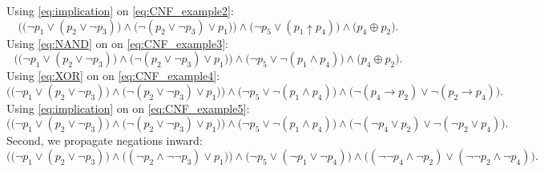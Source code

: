 Using \autoref{eq:implication} on \autoref{eq:CNF_example2}:
\begin{equation}\label{eq:CNF_example3}
    \bigg(
        \Big(
            \neg p_1 \vee (
                p_2 \vee \neg p_3
            )
        \Big) \wedge \Big(
                \neg (
                    p_2 \vee \neg p_3 
                ) \vee p_1 
            \Big)
    \bigg) \wedge \Big(
        \neg p_5 \vee (
            p_1 \uparrow p_4
        )
    \Big) \wedge \Big(
        p_4 \oplus p_2
    \Big).
\end{equation}
Using \autoref{eq:NAND} on on \autoref{eq:CNF_example3}:
\begin{equation}\label{eq:CNF_example4}
    \bigg(
        \Big(
            \neg p_1 \vee (
                p_2 \vee \neg p_3
            )
        \Big) \wedge \Big(
                \neg (
                    p_2 \vee \neg p_3 
                ) \vee p_1 
            \Big)
    \bigg) \wedge \Big(
        \neg p_5 \vee \neg (
            p_1 \wedge p_4
        )
    \Big) \wedge \Big(
        p_4 \oplus p_2
    \Big).
\end{equation}
Using \autoref{eq:XOR} on on \autoref{eq:CNF_example4}:
\begin{equation}\label{eq:CNF_example5}
    \bigg(
        \Big(
            \neg p_1 \vee (
                p_2 \vee \neg p_3
            )
        \Big) \wedge \Big(
                \neg (
                    p_2 \vee \neg p_3 
                ) \vee p_1 
            \Big)
    \bigg) \wedge \Big(
        \neg p_5 \vee \neg (
            p_1 \wedge p_4
        )
    \Big) \wedge \Big(
        \neg (
            p_4 \rightarrow p_2
        ) \vee \neg (
            p_2 \rightarrow p_4
        )
    \Big).
\end{equation}
Using \autoref{eq:implication} on on \autoref{eq:CNF_example5}:
\begin{equation}\label{eq:CNF_example6}
    \bigg(
        \Big(
            \neg p_1 \vee (
                p_2 \vee \neg p_3
            )
        \Big) \wedge \Big(
                \neg (
                    p_2 \vee \neg p_3 
                ) \vee p_1 
            \Big)
    \bigg) \wedge \Big(
        \neg p_5 \vee \neg (
            p_1 \wedge p_4
        )
    \Big) \wedge \Big(
        \neg (
            \neg p_4 \vee p_2
        ) \vee \neg (
            \neg p_2 \vee p_4
        )
    \Big).
\end{equation}
Second, we propagate negations inward:
\begin{equation*}
    \bigg(
        \Big(
            \neg p_1 \vee (
                p_2 \vee \neg p_3
            )
        \Big) \wedge \Big(
                (
                    \neg p_2 \wedge \neg \neg p_3 
                ) \vee p_1 
            \Big)
    \bigg) \wedge \Big(
        \neg p_5 \vee (
            \neg p_1 \vee \neg p_4
        )
    \Big) \wedge \Big(
        (
            \neg \neg p_4 \wedge \neg p_2
        ) \vee (
            \neg \neg p_2 \wedge \neg p_4
        )
    \Big).
\end{equation*}
